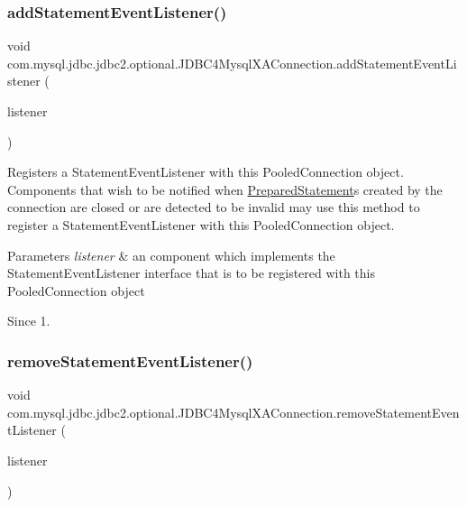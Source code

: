 \subsubsection{\texorpdfstring{add\+Statement\+Event\+Listener()}{addStatementEventListener()}}
{\footnotesize\ttfamily void com.\+mysql.\+jdbc.\+jdbc2.\+optional.\+J\+D\+B\+C4\+Mysql\+X\+A\+Connection.\+add\+Statement\+Event\+Listener (\begin{DoxyParamCaption}\item[{Statement\+Event\+Listener}]{listener }\end{DoxyParamCaption})}

Registers a {\ttfamily Statement\+Event\+Listener} with this {\ttfamily Pooled\+Connection} object. Components that wish to be notified when {\ttfamily \mbox{\hyperlink{classcom_1_1mysql_1_1jdbc_1_1_prepared_statement}{Prepared\+Statement}}}s created by the connection are closed or are detected to be invalid may use this method to register a {\ttfamily Statement\+Event\+Listener} with this {\ttfamily Pooled\+Connection} object.


\begin{DoxyParams}{Parameters}
{\em listener} & an component which implements the {\ttfamily Statement\+Event\+Listener} interface that is to be registered with this {\ttfamily Pooled\+Connection} object \\
\hline
\end{DoxyParams}
\begin{DoxySince}{Since}
1. 
\end{DoxySince}
\mbox{\label{classcom_1_1mysql_1_1jdbc_1_1jdbc2_1_1optional_1_1_j_d_b_c4_mysql_x_a_connection_a608675d31211dc6390a8317d123045b9}} 
\subsubsection{\texorpdfstring{remove\+Statement\+Event\+Listener()}{removeStatementEventListener()}}
{\footnotesize\ttfamily void com.\+mysql.\+jdbc.\+jdbc2.\+optional.\+J\+D\+B\+C4\+Mysql\+X\+A\+Connection.\+remove\+Statement\+Event\+Listener (\begin{DoxyParamCaption}\item[{Statement\+Event\+Listener}]{listener }\end{DoxyParamCaption})}

